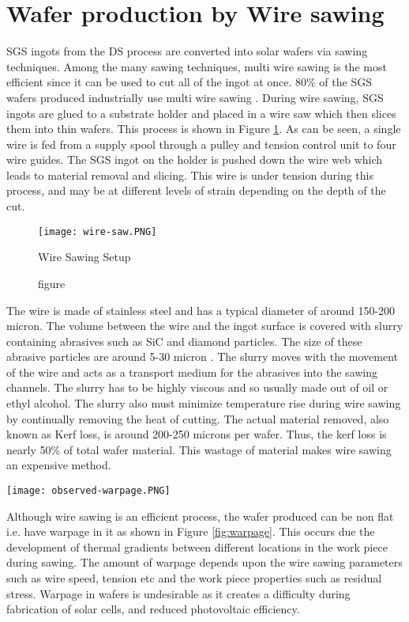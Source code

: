\section{Wafer production by Wire sawing}
SGS ingots from the DS process are converted into solar wafers via sawing techniques. Among the many sawing techniques, multi wire sawing is the most efficient since it can be used to cut all of the ingot at once. 80\% of the SGS wafers produced industrially use multi wire sawing \cite{}. During wire sawing, SGS ingots are glued to a substrate holder and placed in a wire saw which then slices them into thin wafers. This process is shown in Figure \ref{fig:wire-saw}. As can be seen, a single wire is fed from a supply spool through a pulley and tension control unit to four wire guides. The SGS ingot on the holder is pushed down the wire web which leads to material removal and slicing. This wire is under tension during this process, and may be at different levels of strain depending on the depth of the cut.  
\begin{figure}[ht]
    \centering
    \texttt{[image: wire-saw.PNG]}
    \caption{figure}{Wire Sawing Setup}
    \label{fig:wire-saw}
\end{figure}
The wire is made of stainless steel and has a typical diameter of around 150-200 micron. The volume between the wire and the ingot surface is covered with slurry containing abrasives such as SiC and diamond particles. The size of these abrasive particles are around 5-30 micron \cite{}. The slurry moves with the movement of the wire and acts as a transport medium for the abrasives into the sawing channels. The slurry has to be highly viscous and so usually made out of oil or ethyl alcohol. The slurry also must minimize temperature rise during wire sawing by continually removing the heat of cutting. The actual material removed, also known as Kerf loss, is around 200-250 microns per wafer. Thus, the kerf loss is nearly 50\% of total wafer material. This wastage of material makes wire sawing an expensive method.
\newline
\noindent
\begin{minipage}[c]{\textwidth}
\centering
        \captionsetup{type=figure}
        \texttt{[image: observed-warpage.PNG]}
        \label{fig:warpage}
 \end{minipage}
 
Although wire sawing is an efficient process, the wafer produced can be non flat i.e. have warpage in it as shown in Figure \ref{fig:warpage}. This occurs due the development of thermal gradients between different locations in the work piece during sawing. The amount of warpage depends upon the wire sawing parameters such as wire speed, tension etc and the work piece properties such as residual stress. Warpage in wafers is undesirable as it creates a difficulty during fabrication of solar cells, and reduced photovoltaic efficiency. 

